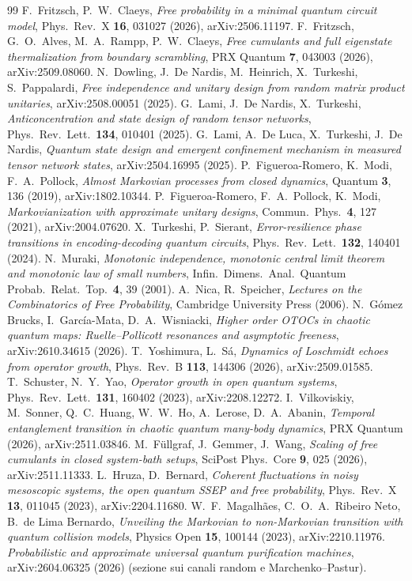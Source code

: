 \begin{thebibliography}{99}\small
{} F.~Fritzsch, P.~W.~Claeys, \emph{Free probability in a minimal quantum circuit model}, Phys.\ Rev.\ X \textbf{16}, 031027 (2026), arXiv:2506.11197.
 F.~Fritzsch, G.~O.~Alves, M.~A.~Rampp, P.~W.~Claeys, \emph{Free cumulants and full eigenstate thermalization from boundary scrambling}, PRX Quantum \textbf{7}, 043003 (2026), arXiv:2509.08060.
 N.~Dowling, J.~De Nardis, M.~Heinrich, X.~Turkeshi, S.~Pappalardi, \emph{Free independence and unitary design from random matrix product unitaries}, arXiv:2508.00051 (2025).
 G.~Lami, J.~De Nardis, X.~Turkeshi, \emph{Anticoncentration and state design of random tensor networks}, Phys.\ Rev.\ Lett.\ \textbf{134}, 010401 (2025).
 G.~Lami, A.~De Luca, X.~Turkeshi, J.~De Nardis, \emph{Quantum state design and emergent confinement mechanism in measured tensor network states}, arXiv:2504.16995 (2025).
 P.~Figueroa-Romero, K.~Modi, F.~A.~Pollock, \emph{Almost Markovian processes from closed dynamics}, Quantum \textbf{3}, 136 (2019), arXiv:1802.10344.
 P.~Figueroa-Romero, F.~A.~Pollock, K.~Modi, \emph{Markovianization with approximate unitary designs}, Commun.\ Phys.\ \textbf{4}, 127 (2021), arXiv:2004.07620.
 X.~Turkeshi, P.~Sierant, \emph{Error-resilience phase transitions in encoding-decoding quantum circuits}, Phys.\ Rev.\ Lett.\ \textbf{132}, 140401 (2024).
 N.~Muraki, \emph{Monotonic independence, monotonic central limit theorem and monotonic law of small numbers}, Infin.\ Dimens.\ Anal.\ Quantum Probab.\ Relat.\ Top.\ \textbf{4}, 39 (2001).
 A.~Nica, R.~Speicher, \emph{Lectures on the Combinatorics of Free Probability}, Cambridge University Press (2006).
 N.~Gómez Brucks, I.~García-Mata, D.~A.~Wisniacki, \emph{Higher order OTOCs in chaotic quantum maps: Ruelle--Pollicott resonances and asymptotic freeness}, arXiv:2610.34615 (2026).
 T.~Yoshimura, L.~Sá, \emph{Dynamics of Loschmidt echoes from operator growth}, Phys.\ Rev.\ B \textbf{113}, 144306 (2026), arXiv:2509.01585.
 T.~Schuster, N.~Y.~Yao, \emph{Operator growth in open quantum systems}, Phys.\ Rev.\ Lett.\ \textbf{131}, 160402 (2023), arXiv:2208.12272.
 I.~Vilkoviskiy, M.~Sonner, Q.~C.~Huang, W.~W.~Ho, A.~Lerose, D.~A.~Abanin, \emph{Temporal entanglement transition in chaotic quantum many-body dynamics}, PRX Quantum (2026), arXiv:2511.03846.
 M.~Füllgraf, J.~Gemmer, J.~Wang, \emph{Scaling of free cumulants in closed system-bath setups}, SciPost Phys.\ Core \textbf{9}, 025 (2026), arXiv:2511.11333.
 L.~Hruza, D.~Bernard, \emph{Coherent fluctuations in noisy mesoscopic systems, the open quantum SSEP and free probability}, Phys.\ Rev.\ X \textbf{13}, 011045 (2023), arXiv:2204.11680.
 W.~F.~Magalhães, C.~O.~A.~Ribeiro Neto, B.~de Lima Bernardo, \emph{Unveiling the Markovian to non-Markovian transition with quantum collision models}, Physics Open \textbf{15}, 100144 (2023), arXiv:2210.11976.
 \emph{Probabilistic and approximate universal quantum purification machines}, arXiv:2604.06325 (2026) (sezione sui canali random e Marchenko--Pastur).
\end{thebibliography}
